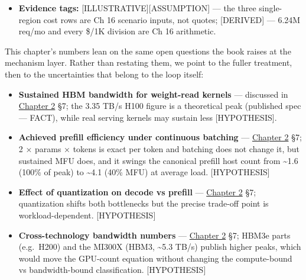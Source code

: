 \begin{itemize}
  and priced for the 99.9\% active-active SLA; (ii) a region-failure
  test defined --- per-region \textbf{weight/index availability
  mandatory}, \textbf{live-KV replication optional} (clients may replay
  or recompute context in the surviving region within the recovery
  objectives, Ch 16 §16.3); (iii) measured p95 SLO-goodput at the target
  offered load; (iv) a matched-scope re-run of the three modes.
\item
  \textbf{Evidence tags:} \mbox{{[}ILLUSTRATIVE{]}}\hspace{0pt}\mbox{{[}ASSUMPTION{]}} --- the
  three single-region cost rows are Ch 16 scenario inputs, not quotes;
  \mbox{{[}DERIVED{]}} --- 6.24M req/mo and every \$/1K division are Ch 16
  arithmetic.
\end{itemize}

\label{what-we-still-dont-know}


This chapter's numbers lean on the same open questions the book raises
at the mechanism layer. Rather than restating them, we point to the
fuller treatment, then to the uncertainties that belong to the loop
itself:

\begin{itemize}
\tightlist
\item
  \textbf{Sustained HBM bandwidth for weight-read kernels} --- discussed
  in \hyperref[chap:2]{Chapter 2} §7; the 3.35 TB/s H100 figure is a theoretical peak
  (published spec --- FACT), while real serving kernels may sustain less
  \mbox{{[}HYPOTHESIS{]}}.
\item
  \textbf{Achieved prefill efficiency under continuous batching} ---
  \hyperref[chap:2]{Chapter 2} §7; 2 × params × tokens is exact per token and batching does
  not change it, but sustained MFU does, and it swings the canonical
  prefill host count from \textasciitilde1.6 (100\% of peak) to
  \textasciitilde4.1 (40\% MFU) at average load. \mbox{{[}HYPOTHESIS{]}}
\item
  \textbf{Effect of quantization on decode vs prefill} --- \hyperref[chap:2]{Chapter 2} §7;
  quantization shifts both bottlenecks but the precise trade-off point
  is workload-dependent. \mbox{{[}HYPOTHESIS{]}}
\item
  \textbf{Cross-technology bandwidth numbers} --- \hyperref[chap:2]{Chapter 2} §7; HBM3e
  parts (e.g.~H200) and the MI300X (HBM3, \textasciitilde5.3 TB/s)
  publish higher peaks, which would move the GPU-count equation without
  changing the compute-bound vs bandwidth-bound classification.
  \mbox{{[}HYPOTHESIS{]}}
\end{itemize}

